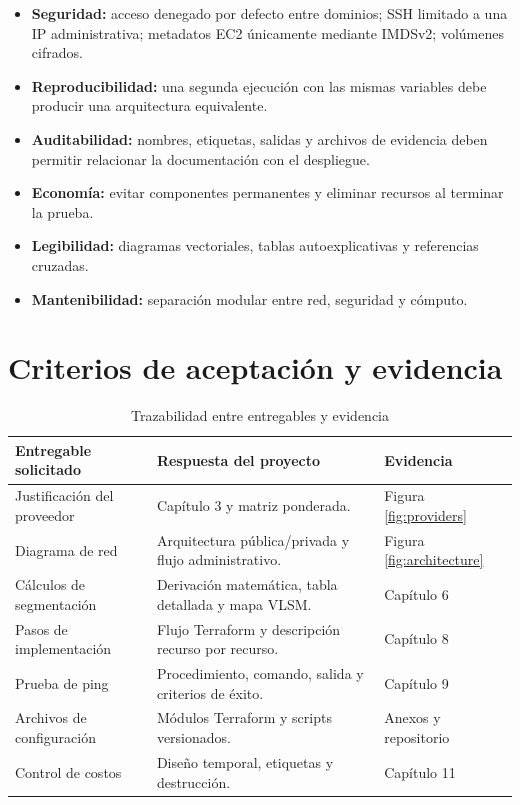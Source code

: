 \begin{itemize}
  \item \textbf{Seguridad:} acceso denegado por defecto entre dominios; SSH limitado a una IP administrativa; metadatos EC2 únicamente mediante IMDSv2; volúmenes cifrados.
  \item \textbf{Reproducibilidad:} una segunda ejecución con las mismas variables debe producir una arquitectura equivalente.
  \item \textbf{Auditabilidad:} nombres, etiquetas, salidas y archivos de evidencia deben permitir relacionar la documentación con el despliegue.
  \item \textbf{Economía:} evitar componentes permanentes y eliminar recursos al terminar la prueba.
  \item \textbf{Legibilidad:} diagramas vectoriales, tablas autoexplicativas y referencias cruzadas.
  \item \textbf{Mantenibilidad:} separación modular entre red, seguridad y cómputo.
\end{itemize}

\section{Criterios de aceptación y evidencia}

\begin{table}[H]
\centering
\caption{Trazabilidad entre entregables y evidencia}
\begin{tabularx}{\textwidth}{p{4.3cm}Y p{3.2cm}}
\toprule
\textbf{Entregable solicitado} & \textbf{Respuesta del proyecto} & \textbf{Evidencia} \\
\midrule
Justificación del proveedor & Capítulo 3 y matriz ponderada. & Figura \ref{fig:providers} \\
Diagrama de red & Arquitectura pública/privada y flujo administrativo. & Figura \ref{fig:architecture} \\
Cálculos de segmentación & Derivación matemática, tabla detallada y mapa VLSM. & Capítulo 6 \\
Pasos de implementación & Flujo Terraform y descripción recurso por recurso. & Capítulo 8 \\
Prueba de ping & Procedimiento, comando, salida y criterios de éxito. & Capítulo 9 \\
Archivos de configuración & Módulos Terraform y scripts versionados. & Anexos y repositorio \\
Control de costos & Diseño temporal, etiquetas y destrucción. & Capítulo 11 \\
\bottomrule
\end{tabularx}
\end{table}

